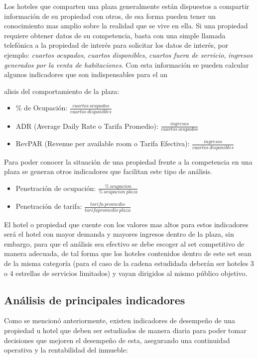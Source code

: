 Los hoteles que comparten una plaza generalmente están dispuestos a compartir información de su propiedad con otros, de esa forma pueden tener un conocimiento mas amplio sobre la realidad que se vive en ella. Si una propiedad requiere obtener datos de su competencia, basta con una simple llamada telefónica a la propiedad de interés para solicitar los datos de interés, por ejemplo: \emph{cuartos ocupados}, \emph{cuartos disponibles}, \emph{cuartos fuera de servicio}, \emph{ingresos generados por la venta de habitaciones}. Con esta información se pueden calcular algunos indicadores que son indispensables para el an{alisis del comportamiento de la plaza:
\begin{itemize}
  \item \% de Ocupación: $\frac{cuartos\ ocupados}{cuartos\ disponibles}$
  \item ADR (Average Daily Rate o Tarifa Promedio): $\frac{ingresos}{cuartos\ ocupados}$
  \item RevPAR (Revenue per available room o Tarifa Efectiva): $\frac{ingresos}{cuartos\ disponibles}$
\end{itemize}

Para poder conocer la situación de una propiedad frente a la competencia en una plaza se generan otros indicadores que facilitan este tipo de análisis.

\begin{itemize}
  \item Penetración de ocupación: $\frac{\%\ ocupacion}{\%\ ocupacion\ plaza}$
  \item Penetración de tarifa: $\frac{tarifa\ promedio}{tarifa promedio\ plaza}$
\end{itemize}

El hotel o propiedad que cuente con los valores mas altos para estos indicadores será el hotel con mayor demanda y mayores ingresos dentro de la plaza, sin embargo, para que el análisis sea efectivo se debe escoger al set competitivo de manera adecuada, de tal forma que los hoteles contenidos dentro de este set sean de la misma categoría (para el caso de la cadena estudidada deberán ser hoteles 3 o 4 estrellas de servicios limitados) y vayan dirigidos al mismo público objetivo.


\subsection*{Análisis de principales indicadores}

Como se mencionó anteriormente, existen indicadores de desempeño de una propiedad u hotel que deben ser estudiados de manera diaria para poder tomar decisiones que mejoren el desempeño de esta, asegurando una continuidad operativa y la rentabilidad del inmueble:

}
